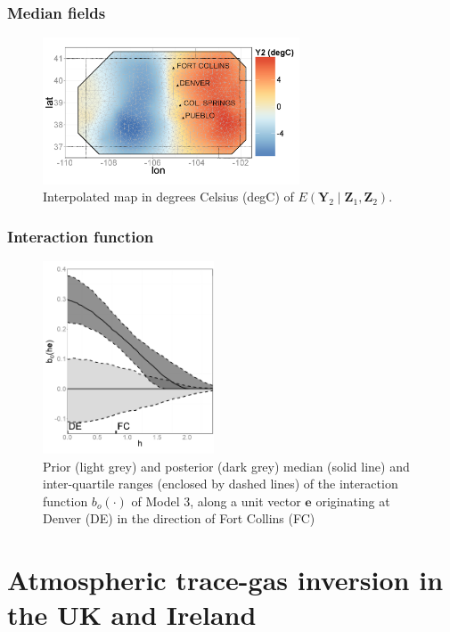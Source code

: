 \documentclass{beamer}
\newcommand{\Yvec}{\mathbf{Y}}
\newcommand{\Zvec}{\mathbf{Z}}
\newcommand{\E}{E}
\begin{document}
\begin{frame}
\frametitle{Median fields}
\begin{figure}
\includegraphics[width=3in]{Fig3a2.png}
\caption{Interpolated map in degrees Celsius (degC) of $\E(\Yvec_2 \mid  \Zvec_1,\Zvec_2)$.}
\end{figure}
\end{frame}


\begin{frame}
\frametitle{Interaction function}


\vspace{-0.1in}
\begin{figure}
\includegraphics[width=2in]{Fig3b.png}
\caption{\small Prior (light grey) and posterior (dark grey) median (solid line) and inter-quartile ranges (enclosed by dashed lines) of the interaction function $b_o(\cdot)$ of Model 3, along a unit vector $\mathbf{e}$ originating at Denver (DE) in the direction of Fort Collins (FC)}
\end{figure}

\end{frame}

\normalsize


\section{Atmospheric trace-gas inversion in the UK and Ireland}


\begin{frame}
\sectionpage
\end{frame}
\end{document}
